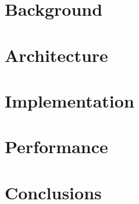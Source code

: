 \documentclass[a4paper]{article}
\begin{document}
\section{Background}

\section{Architecture}

\section{Implementation}

\section{Performance}

\section{Conclusions}



\end{document}
